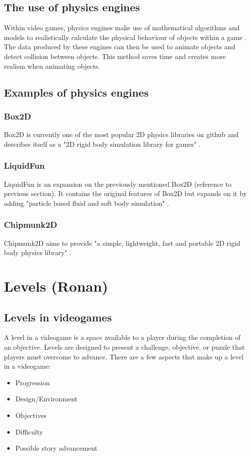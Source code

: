 \documentclass{article} %
\begin{document}
\subsection{The use of physics engines}

Within video games, physics engines make use of mathematical algorithms and models to realistically calculate the physical behaviour of objects within a game \cite{Ipacs_2023}. The data produced by these engines can then be used to animate objects and detect collision between objects. This method saves time and creates more realism when animating objects.

\subsection{Examples of physics engines}

\subsubsection{Box2D}

Box2D is currently one of the most popular 2D physics libraries on github and describes itself as a "2D rigid body simulation library for games" \cite{Catto_2024}.

\subsubsection{LiquidFun}

LiquidFun is an expansion on the previously mentioned Box2D (reference to previous section). It contains the original features of Box2D but expands on it by adding "particle based fluid and soft body simulation" \cite{Miles_2014}.

\subsubsection{Chipmunk2D}

Chipmunk2D aims to provide "a simple, lightweight, fast and portable 2D rigid body physics library" \cite{Slembcke_2023}.

\newpage

\section{Levels (Ronan)}
\subsection{Levels in videogames}
A level in a videogame is a space available to a player during
the completion of an objective. Levels are designed to present a challenge,
objective, or puzzle that players must overcome to advance.
There are a few aspects that make up a level in a videogame:
\begin{itemize}
	\item Progression
	\item Design/Environment
	\item Objectives
	\item Difficulty
	\item Possible story advancement
\end{itemize}
\end{document}
